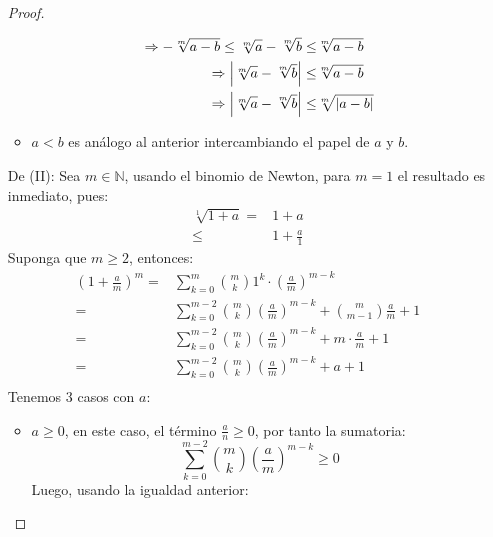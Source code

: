 \documentclass[12pt]{article}
\begin{document}
\begin{enumerate}
\begin{proof}
\begin{itemize}
\begin{equation*}
\begin{split}
                    \Rightarrow -\sqrt[m]{a-b}\leq\sqrt[m]{a}-\sqrt[m]{b}\leq&\sqrt[m]{a-b}\\
                    \Rightarrow \left| \sqrt[m]{a}-\sqrt[m]{b} \right|\leq&\sqrt[m]{a-b}\\
                    \Rightarrow \left| \sqrt[m]{a}-\sqrt[m]{b} \right|\leq&\sqrt[m]{\left| a-b \right|}\\
                \end{split}
            \end{equation*}
            \item $a<b$ es análogo al anterior intercambiando el papel de $a$ y $b$. 
        \end{itemize}
        De (II): Sea $m\in\mathbb{N}$, usando el binomio de Newton, para $m=1$ el resultado es inmediato, pues:
        \begin{equation*}
            \begin{split}
                \sqrt[1]{1+a}=&1+a\\
                \leq&1+\frac{a}{1}
            \end{split}
        \end{equation*}
        Suponga que $m\geq2$, entonces:
        \begin{equation*}
            \begin{split}
                \left(1+\frac{a}{m}\right)^m=&\sum_{k=0}^{m} {m \choose k} 1^k\cdot \left(\frac{a}{m}\right)^{m-k}\\
                =&\sum_{k=0}^{m-2} {m \choose k} \left(\frac{a}{m}\right)^{m-k}+{m \choose m-1}\frac{a}{m}+1\\
                =&\sum_{k=0}^{m-2} {m \choose k} \left(\frac{a}{m}\right)^{m-k}+m\cdot\frac{a}{m}+1\\
                =&\sum_{k=0}^{m-2} {m \choose k} \left(\frac{a}{m}\right)^{m-k}+a+1\\
            \end{split}
        \end{equation*}
        Tenemos 3 casos con $a$:
        \begin{itemize}
            \item $a\geq0$, en este caso, el término $\frac{a}{n}\geq0$, por tanto la sumatoria:
            \begin{equation*}
                \sum_{k=0}^{m-2} {m \choose k} \left(\frac{a}{m}\right)^{m-k}\geq0
            \end{equation*}
            Luego, usando la igualdad anterior:
            \begin{equation*}

\end{equation*}
\end{itemize}
\end{proof}
\end{enumerate}
\end{document}
